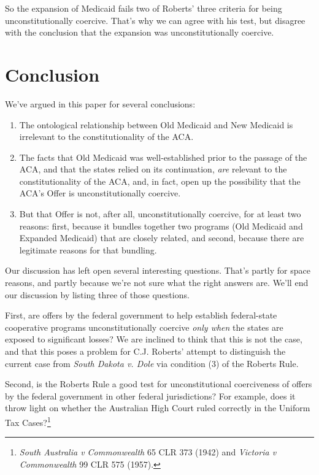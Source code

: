 \documentclass[
  11pt,
  letterpaper,
  DIV=11,
  numbers=noendperiod,
  twoside]{scrartcl}
\providecommand{\tightlist}{%
  \setlength{\itemsep}{0pt}\setlength{\parskip}{0pt}}
\begin{document}
So the expansion of Medicaid fails two of Roberts' three criteria for
being unconstitutionally coercive. That's why we can agree with his
test, but disagree with the conclusion that the expansion was
unconstitutionally coercive.

\section{Conclusion}\label{conclusion}

We've argued in this paper for several conclusions:

\begin{enumerate}
\def\labelenumi{\arabic{enumi}.}
\tightlist
\item
  The ontological relationship between Old Medicaid and New Medicaid is
  irrelevant to the constitutionality of the ACA.
\item
  The facts that Old Medicaid was well-established prior to the passage
  of the ACA, and that the states relied on its continuation, \emph{are}
  relevant to the constitutionality of the ACA, and, in fact, open up
  the possibility that the ACA's Offer is unconstitutionally coercive.
\item
  But that Offer is not, after all, unconstitutionally coercive, for at
  least two reasons: first, because it bundles together two programs
  (Old Medicaid and Expanded Medicaid) that are closely related, and
  second, because there are legitimate reasons for that bundling.
\end{enumerate}

Our discussion has left open several interesting questions. That's
partly for space reasons, and partly because we're not sure what the
right answers are. We'll end our discussion by listing three of those
questions.

First, are offers by the federal government to help establish
federal-state cooperative programs unconstitutionally coercive
\emph{only when} the states are exposed to significant losses? We are
inclined to think that this is not the case, and that this poses a
problem for C.J. Roberts' attempt to distinguish the current case from
\emph{South Dakota v. Dole} via condition (3) of the Roberts Rule.

Second, is the Roberts Rule a good test for unconstitutional
coerciveness of offers by the federal government in other federal
jurisdictions? For example, does it throw light on whether the
Australian High Court ruled correctly in the Uniform Tax
Cases?\footnote{\emph{South Australia v Commonwealth} 65 CLR 373 (1942)
  and \emph{Victoria v Commonwealth} 99 CLR 575 (1957).}
\end{document}
